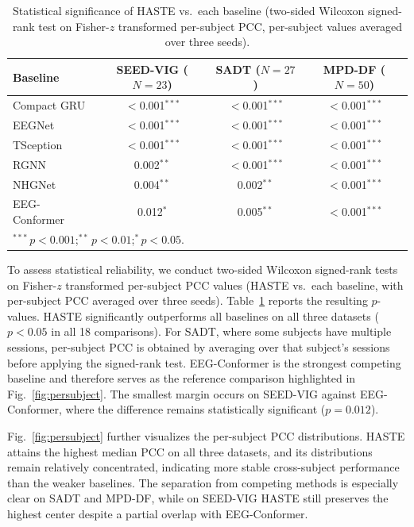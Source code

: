 \documentclass[preprint,12pt]{elsarticle}
\begin{document}
\begin{table}[!t]
\centering
\caption{Statistical significance of HASTE vs.\ each baseline
(two-sided Wilcoxon signed-rank test on Fisher-$z$ transformed per-subject PCC,
per-subject values averaged over three seeds).}
\label{tab:significance}
\renewcommand{\arraystretch}{1.12}
\setlength{\tabcolsep}{5pt}
\footnotesize
\begin{tabular}{lccc}
\toprule
\textbf{Baseline}
& \textbf{SEED-VIG} ($N{=}23$)
& \textbf{SADT} ($N{=}27$)
& \textbf{MPD-DF} ($N{=}50$) \\
\midrule
Compact GRU
& $<$0.001$^{***}$ & $<$0.001$^{***}$ & $<$0.001$^{***}$ \\
EEGNet
& $<$0.001$^{***}$ & $<$0.001$^{***}$ & $<$0.001$^{***}$ \\
TSception
& $<$0.001$^{***}$ & $<$0.001$^{***}$ & $<$0.001$^{***}$ \\
RGNN
& \phantom{$<$}0.002$^{**}$\phantom{0}
& $<$0.001$^{***}$ & $<$0.001$^{***}$ \\
NHGNet
& \phantom{$<$}0.004$^{**}$\phantom{0}
& \phantom{$<$}0.002$^{**}$\phantom{0}
& $<$0.001$^{***}$ \\
EEG-Conformer
& \phantom{$<$}0.012$^{*}$\phantom{00}
& \phantom{$<$}0.005$^{**}$\phantom{0}
& $<$0.001$^{***}$ \\
\bottomrule
\multicolumn{4}{l}{\scriptsize $^{***}\,p<0.001$;\quad $^{**}\,p<0.01$;\quad $^{*}\,p<0.05$.}
\end{tabular}
\end{table}

To assess statistical reliability, we conduct two-sided Wilcoxon signed-rank tests
on Fisher-$z$ transformed per-subject PCC values (HASTE vs.\ each baseline,
with per-subject PCC averaged over three seeds).
Table~\ref{tab:significance} reports the resulting $p$-values.
HASTE significantly outperforms all baselines on all three datasets ($p<0.05$ in all 18 comparisons).
For SADT, where some subjects have multiple sessions, per-subject PCC is obtained by averaging over that subject's sessions before applying the signed-rank test.
EEG-Conformer is the strongest competing baseline and therefore serves as the reference comparison highlighted in Fig.~\ref{fig:persubject}.
The smallest margin occurs on SEED-VIG against EEG-Conformer, where the difference remains statistically significant ($p=0.012$).

Fig.~\ref{fig:persubject} further visualizes the per-subject PCC distributions.
HASTE attains the highest median PCC on all three datasets, and its distributions remain relatively concentrated,
indicating more stable cross-subject performance than the weaker baselines.
The separation from competing methods is especially clear on SADT and MPD-DF,
while on SEED-VIG HASTE still preserves the highest center despite a partial overlap with EEG-Conformer.
\end{document}
